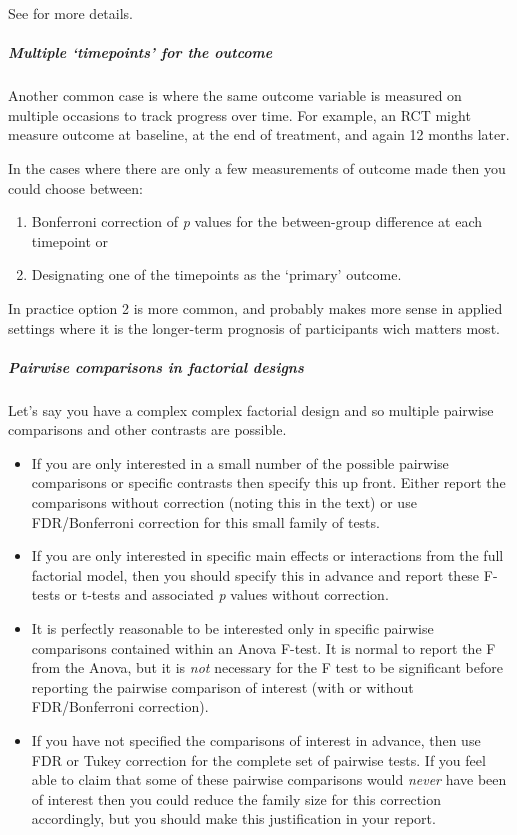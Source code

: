 \documentclass[]{article}
\providecommand{\tightlist}{%
  \setlength{\itemsep}{0pt}\setlength{\parskip}{0pt}}
\let\oldsubparagraph\subparagraph
\renewcommand{\subparagraph}[1]{\oldsubparagraph{#1}\mbox{}}
\theoremstyle{definition}
\theoremstyle{definition}
\theoremstyle{definition}
\theoremstyle{remark}
\begin{document}
See \citet{feise2002multiple} for more details.

\subparagraph{\texorpdfstring{Multiple `timepoints' for the
outcome}{Multiple timepoints for the outcome}}\label{multiple-timepoints-for-the-outcome}

Another common case is where the same outcome variable is measured on
multiple occasions to track progress over time. For example, an RCT
might measure outcome at baseline, at the end of treatment, and again 12
months later.

In the cases where there are only a few measurements of outcome made
then you could choose between:

\begin{enumerate}
\def\labelenumi{\arabic{enumi}.}
\tightlist
\item
  Bonferroni correction of \emph{p} values for the between-group
  difference at each timepoint or
\item
  Designating one of the timepoints as the `primary' outcome.
\end{enumerate}

In practice option 2 is more common, and probably makes more sense in
applied settings where it is the longer-term prognosis of participants
wich matters most.

\subparagraph{Pairwise comparisons in factorial
designs}\label{pairwise-comparisons-in-factorial-designs}

Let's say you have a complex complex factorial design and so multiple
pairwise comparisons and other contrasts are possible.

\begin{itemize}
\item
  If you are only interested in a small number of the possible pairwise
  comparisons or specific contrasts then specify this up front. Either
  report the comparisons without correction (noting this in the text) or
  use FDR/Bonferroni correction for this small family of tests.
\item
  If you are only interested in specific main effects or interactions
  from the full factorial model, then you should specify this in advance
  and report these F-tests or t-tests and associated \emph{p} values
  without correction.
\item
  It is perfectly reasonable to be interested only in specific pairwise
  comparisons contained within an Anova F-test. It is normal to report
  the F from the Anova, but it is \emph{not} necessary for the F test to
  be significant before reporting the pairwise comparison of interest
  (with or without FDR/Bonferroni correction).
\item
  If you have not specified the comparisons of interest in advance, then
  use FDR or Tukey correction for the complete set of pairwise tests. If
  you feel able to claim that some of these pairwise comparisons would
  \emph{never} have been of interest then you could reduce the family
  size for this correction accordingly, but you should make this
  justification in your report.
\end{itemize}
\end{document}
